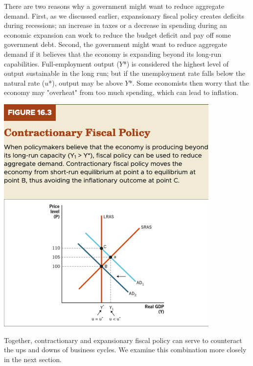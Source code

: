 \documentclass[11pt]{article} %
\begin{document}
There are two reasons why a government might want to reduce aggregate demand. First, as we discussed earlier, expansionary fiscal policy creates deficits during recessions; an increase in taxes or a decrease in spending during an economic expansion can work to reduce the budget deficit and pay off some government debt.
Second, the government might want to reduce aggregate demand if it believes that the economy is expanding beyond its long-run capabilities. Full-employment output ($Y$*) is considered the highest level of output sustainable in the long run; but if the unemployment rate falls below the natural rate ($u$*), output may be above $Y$*. Some economists then worry that the economy may "overheat" from too much spending, which can lead to inflation.

\begin{center}
\includegraphics[scale=0.5]{images/Figure 16.3.png} 
\end{center}

Together, contractionary and expansionary fiscal policy can serve to counteract the ups and downs of business cycles. We examine this combination more closely in the next section.
\end{document}
